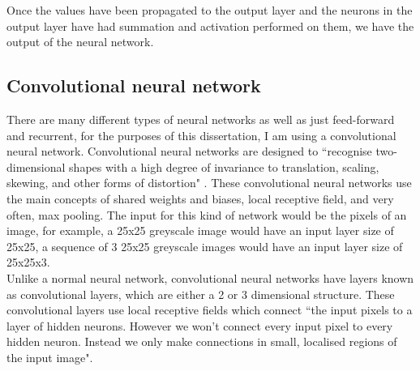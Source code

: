 \documentclass[10pt]{article}
\begin{document}
		Once the values have been propagated to the output layer and the neurons in the output layer have had summation and activation performed on them, we have the output of the neural network.\\
		
		\medskip
		
		\subsection{Convolutional neural network}
		
		 There are many different types of neural networks as well as just feed-forward and recurrent, for the purposes of this dissertation, I am using a convolutional neural network. Convolutional neural networks are designed to ``recognise two-dimensional shapes with a high degree of invariance to translation, scaling, skewing, and other forms of distortion" \cite{nncomp}. These convolutional neural networks use the main concepts of shared weights and biases, local receptive field, and very often, max pooling. The input for this kind of network would be the pixels of an image, for example, a 25x25 greyscale image would have an input layer size of 25x25, a sequence of 3 25x25 greyscale images would have an input layer size of 25x25x3.\\
		 
		 Unlike a normal neural network, convolutional neural networks have layers known as convolutional layers, which are either a 2 or 3 dimensional structure. These convolutional layers use local receptive fields which connect ``the input pixels to a layer of hidden neurons. However we won't connect every input pixel to every hidden neuron. Instead we only make connections in small, localised regions of the input image"\cite{nndl}.\\
		 
\end{document}
